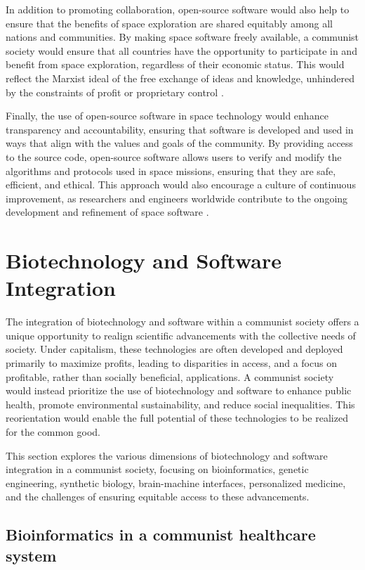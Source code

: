 In addition to promoting collaboration, open-source software would also help to ensure that the benefits of space exploration are shared equitably among all nations and communities. By making space software freely available, a communist society would ensure that all countries have the opportunity to participate in and benefit from space exploration, regardless of their economic status. This would reflect the Marxist ideal of the free exchange of ideas and knowledge, unhindered by the constraints of profit or proprietary control \cite[pp.~230-233]{bookchin1991}.

Finally, the use of open-source software in space technology would enhance transparency and accountability, ensuring that software is developed and used in ways that align with the values and goals of the community. By providing access to the source code, open-source software allows users to verify and modify the algorithms and protocols used in space missions, ensuring that they are safe, efficient, and ethical. This approach would also encourage a culture of continuous improvement, as researchers and engineers worldwide contribute to the ongoing development and refinement of space software \cite[pp.~78-81]{bookchin1986}.

\section{Biotechnology and Software Integration}

The integration of biotechnology and software within a communist society offers a unique opportunity to realign scientific advancements with the collective needs of society. Under capitalism, these technologies are often developed and deployed primarily to maximize profits, leading to disparities in access, and a focus on profitable, rather than socially beneficial, applications. A communist society would instead prioritize the use of biotechnology and software to enhance public health, promote environmental sustainability, and reduce social inequalities. This reorientation would enable the full potential of these technologies to be realized for the common good.

This section explores the various dimensions of biotechnology and software integration in a communist society, focusing on bioinformatics, genetic engineering, synthetic biology, brain-machine interfaces, personalized medicine, and the challenges of ensuring equitable access to these advancements.

\subsection{Bioinformatics in a communist healthcare system}


